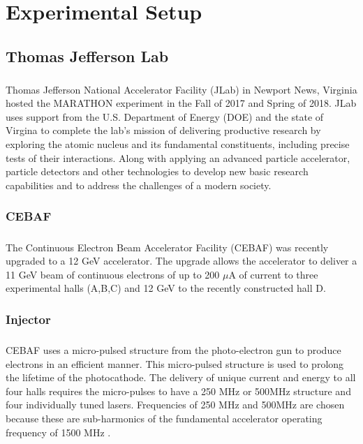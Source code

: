 


\chapter{ Experimental Setup} \label{ch:ExpUp}

\section{Thomas Jefferson Lab}
\paragraph{}Thomas Jefferson National Accelerator Facility (JLab) in Newport News, Virginia hosted the MARATHON experiment in the Fall of 2017 and Spring of 2018. JLab uses support from the U.S. Department of Energy (DOE) and the state of Virgina to complete the lab's mission of delivering productive research by exploring the atomic nucleus and its fundamental constituents, including precise tests of their interactions. Along with applying an advanced particle accelerator, particle detectors and other technologies to develop new basic research capabilities and to address the challenges of a modern society.
\subsection{CEBAF}\label{sec:cebaf}
	\paragraph{}The Continuous Electron Beam Accelerator Facility (CEBAF) was recently upgraded to a 12 GeV accelerator. The upgrade allows the accelerator to deliver a 11 GeV beam of continuous electrons of up to 200 $\mu$A of current to three experimental halls (A,B,C) and 12 GeV to the recently constructed hall D. 
\subsection{Injector}
	\paragraph{} CEBAF uses a micro-pulsed structure from the photo-electron gun to produce electrons in an efficient manner. This micro-pulsed structure is used to prolong the lifetime of the photocathode. The delivery of unique current and energy to all four halls requires the micro-pulses to have a 250 MHz or 500MHz structure and four individually tuned lasers. Frequencies of 250 MHz and 500MHz are chosen because these are sub-harmonics of the fundamental accelerator operating frequency of 1500 MHz \cite{CEBAF}. 

